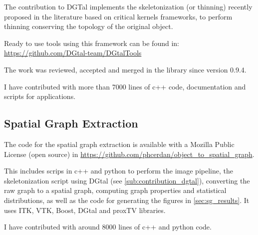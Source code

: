 The contribution to DGTal implements the skeletonization (or thinning) recently proposed in the
literature \cite{couprie_3d_2015, bertrand_parallel_2017} based on critical kernels frameworks, to perform thinning conserving the topology of the original object.

Ready to use tools using this framework can be found in:
\url{https://github.com/DGtal-team/DGtalTools}

The work was reviewed, accepted and merged in the library since version 0.9.4.

I have contributed with more than 7000 lines of c++ code, documentation and scripts for applications.

\subsection{Spatial Graph Extraction}%
\label{sub:spatial_graph_extraction}

The code for the spatial graph extraction is available with a Mozilla Public License (open source) in
\url{https://github.com/phcerdan/object_to_spatial_graph}.

This includes scrips in c++ and python to perform the image pipeline, the skeletonization script using DGtal (see \autoref{sub:contribution_dgtal}), converting the raw graph to a spatial graph, computing graph properties and statistical distributions, as well as the code for generating the figures in \autoref{sec:sg_results}. It uses ITK, VTK, Boost, DGtal and proxTV libraries.

I have contributed with around 8000 lines of c++ and python code.






